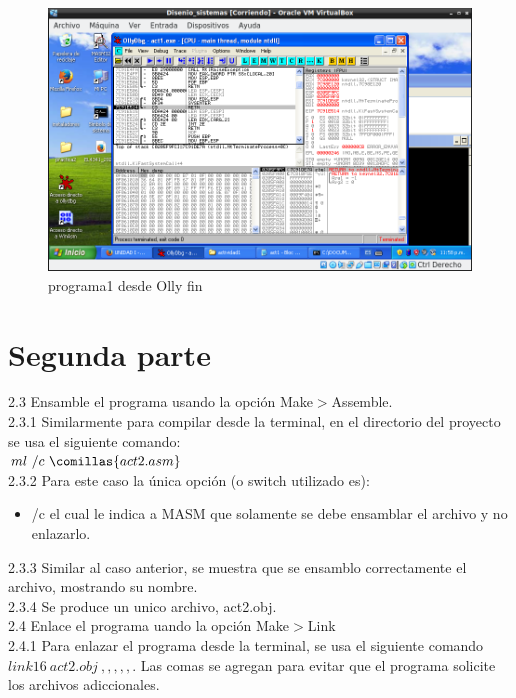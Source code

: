\begin{figure}[H]
  \includegraphics[width=\linewidth]{practica2/imagenes/ej1/olly5.png}
  \caption{programa1 desde Olly fin}
\end{figure}



\section{Segunda parte}

\large{2.3} Ensamble el programa usando la opción Make$>$Assemble.\\

\large{2.3.1} Similarmente para compilar desde la terminal, en el directorio del proyecto se usa el siguiente comando: \\
$ml \  /c \  \comillas{act2.asm}$\\

\large{2.3.2} Para este caso la única opción (o switch utilizado es):
\begin{itemize}
  \item  /c  el cual le indica a MASM que solamente se debe ensamblar el archivo y no enlazarlo.
\end{itemize}

\large{2.3.3} Similar al caso anterior, se muestra que se ensamblo correctamente el archivo, mostrando su nombre.\\


\large{2.3.4} Se produce un unico archivo, act2.obj.\\

\large{2.4} Enlace el programa uando la opción Make$>$Link\\

\large{2.4.1} Para enlazar el programa desde la terminal, se usa el siguiente comando $link16\ act2.obj\ ,,,,,$. Las comas se agregan para evitar que el programa solicite los archivos adiccionales.\\


